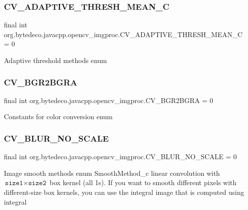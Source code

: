 \subsubsection{\texorpdfstring{C\+V\+\_\+\+A\+D\+A\+P\+T\+I\+V\+E\+\_\+\+T\+H\+R\+E\+S\+H\+\_\+\+M\+E\+A\+N\+\_\+C}{CV\_ADAPTIVE\_THRESH\_MEAN\_C}}
{\footnotesize\ttfamily final int org.\+bytedeco.\+javacpp.\+opencv\+\_\+imgproc.\+C\+V\+\_\+\+A\+D\+A\+P\+T\+I\+V\+E\+\_\+\+T\+H\+R\+E\+S\+H\+\_\+\+M\+E\+A\+N\+\_\+C = 0\hspace{0.3cm}{\ttfamily [static]}}

Adaptive threshold methods enum \mbox{\label{group__imgproc__c_ga2a997fb46eb3c46bcb8c1a1af53baf03}} 
\subsubsection{\texorpdfstring{C\+V\+\_\+\+B\+G\+R2\+B\+G\+RA}{CV\_BGR2BGRA}}
{\footnotesize\ttfamily final int org.\+bytedeco.\+javacpp.\+opencv\+\_\+imgproc.\+C\+V\+\_\+\+B\+G\+R2\+B\+G\+RA = 0\hspace{0.3cm}{\ttfamily [static]}}

Constants for color conversion enum \mbox{\label{group__imgproc__c_ga41b42253aaff66342934c5f37e1d2024}} 
\subsubsection{\texorpdfstring{C\+V\+\_\+\+B\+L\+U\+R\+\_\+\+N\+O\+\_\+\+S\+C\+A\+LE}{CV\_BLUR\_NO\_SCALE}}
{\footnotesize\ttfamily final int org.\+bytedeco.\+javacpp.\+opencv\+\_\+imgproc.\+C\+V\+\_\+\+B\+L\+U\+R\+\_\+\+N\+O\+\_\+\+S\+C\+A\+LE = 0\hspace{0.3cm}{\ttfamily [static]}}

Image smooth methods enum Smooth\+Method\+\_\+c linear convolution with $\texttt{size1}\times\texttt{size2}$ box kernel (all 1\textquotesingle{}s). If you want to smooth different pixels with different-\/size box kernels, you can use the integral image that is computed using integral \mbox{\label{group__imgproc__c_gac8599b677d21172853e57b31a4240338}} 
